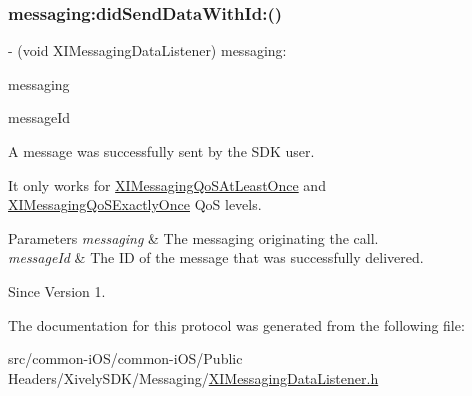 \subsubsection{\texorpdfstring{messaging\+:did\+Send\+Data\+With\+Id\+:()}{messaging:didSendDataWithId:()}}
{\footnotesize\ttfamily -\/ (void X\+I\+Messaging\+Data\+Listener) messaging\+: \begin{DoxyParamCaption}\item[{(id$<$ X\+I\+Messaging $>$)}]{messaging }\item[{didSendDataWithId:(N\+S\+Integer)}]{message\+Id }\end{DoxyParamCaption}\hspace{0.3cm}{\ttfamily [optional]}}



A message was successfully sent by the S\+DK user. 

It only works for \hyperlink{}{X\+I\+Messaging\+Qo\+S\+At\+Least\+Once} and \hyperlink{}{X\+I\+Messaging\+Qo\+S\+Exactly\+Once} QoS levels. 
\begin{DoxyParams}{Parameters}
{\em messaging} & The messaging originating the call. \\
\hline
{\em message\+Id} & The ID of the message that was successfully delivered. \\
\hline
\end{DoxyParams}
\begin{DoxySince}{Since}
Version 1. 
\end{DoxySince}


The documentation for this protocol was generated from the following file\+:\begin{DoxyCompactItemize}
\item 
src/common-\/i\+O\+S/common-\/i\+O\+S/\+Public Headers/\+Xively\+S\+D\+K/\+Messaging/\hyperlink{_x_i_messaging_data_listener_8h}{X\+I\+Messaging\+Data\+Listener.\+h}\end{DoxyCompactItemize}
